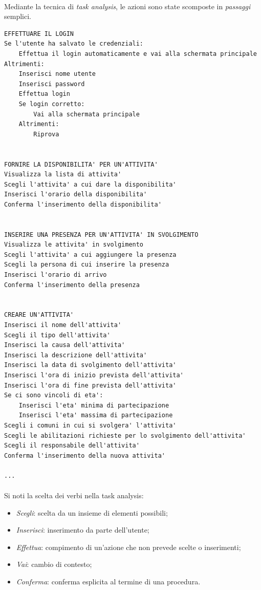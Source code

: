 \documentclass[12pt,a4paper,twoside,english,italian]{book}
\begin{document}
\paragraph{} Mediante la tecnica di \emph{task analysis}, le azioni sono state scomposte in \emph{passaggi} semplici. 

\begin{lstlisting}[title=Task analysis]
EFFETTUARE IL LOGIN
Se l'utente ha salvato le credenziali: 
    Effettua il login automaticamente e vai alla schermata principale
Altrimenti:
    Inserisci nome utente 
    Inserisci password
    Effettua login
    Se login corretto:
        Vai alla schermata principale
    Altrimenti: 
        Riprova
        
        
FORNIRE LA DISPONIBILITA' PER UN'ATTIVITA'
Visualizza la lista di attivita'
Scegli l'attivita' a cui dare la disponibilita'
Inserisci l'orario della disponibilita'
Conferma l'inserimento della disponibilita'


INSERIRE UNA PRESENZA PER UN'ATTIVITA' IN SVOLGIMENTO
Visualizza le attivita' in svolgimento
Scegli l'attivita' a cui aggiungere la presenza
Scegli la persona di cui inserire la presenza
Inserisci l'orario di arrivo 
Conferma l'inserimento della presenza


CREARE UN'ATTIVITA'
Inserisci il nome dell'attivita'
Scegli il tipo dell'attivita'
Inserisci la causa dell'attivita'
Inserisci la descrizione dell'attivita'
Inserisci la data di svolgimento dell'attivita'
Inserisci l'ora di inizio prevista dell'attivita'
Inserisci l'ora di fine prevista dell'attivita'
Se ci sono vincoli di eta':
    Inserisci l'eta' minima di partecipazione
    Inserisci l'eta' massima di partecipazione
Scegli i comuni in cui si svolgera' l'attivita'
Scegli le abilitazioni richieste per lo svolgimento dell'attivita'
Scegli il responsabile dell'attivita'
Conferma l'inserimento della nuova attivita' 

...
\end{lstlisting}

\paragraph{} Si noti la scelta dei verbi nella task analysis:
\begin{itemize}
    \item \textit{Scegli}: scelta da un insieme di elementi possibili;
    \item \textit{Inserisci}: inserimento da parte dell'utente;
    \item \textit{Effettua}: compimento di un'azione che non prevede scelte o inserimenti;
    \item \textit{Vai}: cambio di contesto;
    \item \textit{Conferma}: conferma esplicita al termine di una procedura.
\end{itemize}
\end{document}
